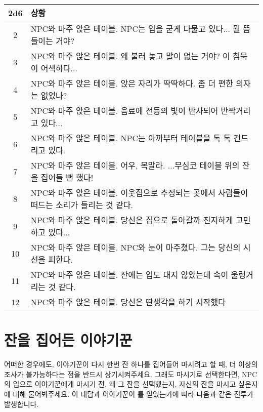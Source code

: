\documentclass{report}
\begin{document}
	\begin{tabularx}{\linewidth}{c!{\color{black}\vrule}X}
		2d6&상황\\\hline\hline
		
		2&NPC와 마주 앉은 테이블. NPC는 입을 굳게 다물고 있다... 뭘 뜸들이는 거야?\\\hline
		
		3&NPC와 마주 앉은 테이블. 왜 불러 놓고 말이 없는 거야? 이 침묵이 어색하다...\\\hline
		
		4&NPC와 마주 앉은 테이블. 앉은 자리가 딱딱하다. 좀 더 편한 의자는 없었나?\\\hline
		
		5&NPC와 마주 앉은 테이블. 음료에 전등의 빛이 반사되어 반짝거리고 있다...\\\hline
		
		6&NPC와 마주 앉은 테이블. NPC는 아까부터 테이블을 톡 톡 건드리고 있다.\\\hline
		
		7&NPC와 마주 앉은 테이블. 어우, 목말라. ...무심코 테이블 위의 잔을 집어들 뻔 했다!\\\hline
		
		8&NPC와 마주 앉은 테이블. 이웃집으로 추정되는 곳에서 사람들이 떠드는 소리가  들리는 것 같다.\\\hline
		
		9&NPC와 마주 앉은 테이블. 당신은 집으로 돌아갈까 진지하게 고민하고 있다...\\\hline
		
		10&NPC와 마주 앉은 테이블. NPC와 눈이 마주쳤다. 그는 당신의 시선을 피한다.\\\hline
		
		11&NPC와 마주 앉은 테이블. 잔에는 입도 대지 않았는데 속이 울렁거리는 것 같다.\\\hline
		
		12&NPC와 마주 앉은 테이블. 당신은 딴생각을 하기 시작했다
	\end{tabularx}
	
	\section{잔을 집어든 이야기꾼}
	
	어떠한 경우에도, 이야기꾼이 다시 한번 잔 하나를 집어들어 마시려고 할 때, 더 이상의 조사가 불가능하다는 점을 반드시 상기시켜주세요. 그래도 마시기로 선택한다면, NPC의 입으로 이야기꾼에게 마시기 전, 왜 그 잔을 선택했는지, 자신의 잔을 마시고 싶은지에 대해 물어봐주세요. 이 대답과 이야기꾼이 를 얻었는가에 따라 다음과 같은 전투가 발생합니다.
	
\end{document}
